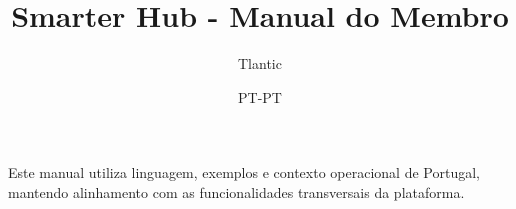 \documentclass[11pt,a4paper]{report}
\title{Smarter Hub - Manual do Membro}
\author{Tlantic}
\date{PT-PT}
\begin{document}
\maketitle
\begin{manualnote}
Este manual utiliza linguagem, exemplos e contexto operacional de Portugal, mantendo alinhamento com as funcionalidades transversais da plataforma.
\end{manualnote}
\tableofcontents

\end{document}

